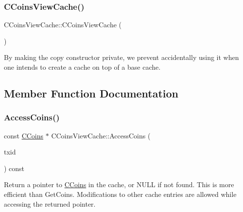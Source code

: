 \mbox{\label{class_c_coins_view_cache_ae984d8a03ff13d03abf11874c227eaf1}} 
\subsubsection{\texorpdfstring{C\+Coins\+View\+Cache()}{CCoinsViewCache()}\hspace{0.1cm}{\footnotesize\ttfamily [2/2]}}
{\footnotesize\ttfamily C\+Coins\+View\+Cache\+::\+C\+Coins\+View\+Cache (\begin{DoxyParamCaption}\item[{const \mbox{\hyperlink{class_c_coins_view_cache}{C\+Coins\+View\+Cache}} \&}]{ }\end{DoxyParamCaption})\hspace{0.3cm}{\ttfamily [private]}}

By making the copy constructor private, we prevent accidentally using it when one intends to create a cache on top of a base cache. 

\subsection{Member Function Documentation}
\mbox{\label{class_c_coins_view_cache_a8e5341e8b01233949d6170dd4d1fd75d}} 
\subsubsection{\texorpdfstring{Access\+Coins()}{AccessCoins()}}
{\footnotesize\ttfamily const \mbox{\hyperlink{class_c_coins}{C\+Coins}} $\ast$ C\+Coins\+View\+Cache\+::\+Access\+Coins (\begin{DoxyParamCaption}\item[{const \mbox{\hyperlink{classuint256}{uint256}} \&}]{txid }\end{DoxyParamCaption}) const}

Return a pointer to \mbox{\hyperlink{class_c_coins}{C\+Coins}} in the cache, or N\+U\+LL if not found. This is more efficient than Get\+Coins. Modifications to other cache entries are allowed while accessing the returned pointer. \mbox{\label{class_c_coins_view_cache_a3d661381b7eb233a8a13ea11ec5dac51}} 
